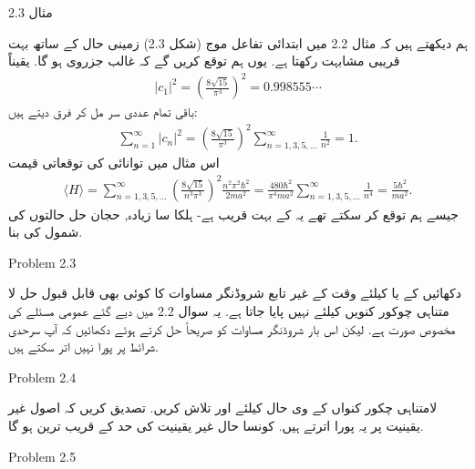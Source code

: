 مثال 2.3
 
ہم دیکھتے ہیں کہ مثال 2.2 میں ابتدائی تفاعل موج (شکل 2.3) زمینی حال  کے ساتھ بہت قریبی مشابہت رکھتا ہے. یوں ہم توقع کریں گے کہ 
 غالب جزروی ہو گا. یقیناً 
\begin{align*}
\left| c_{1} \right|^{2} = \left( \frac{8\sqrt{15}}{\pi^{3}} \right)^{2} = 0.998555 \cdots
\end{align*}
باقی تمام عددی سر مل کر فرق دیتے ہیں:
\begin{align*}
\sum_{n=1}^{\infty} \left| c_{n} \right|^{2} = \left( \frac{8\sqrt{15}}{\pi^{3}} \right)^{2} \sum_{n=1,3,5,...}^{\infty} \frac{1}{n^{2}} = 1.
\end{align*}
اس مثال میں توانائی کی توقعاتی قیمت
\begin{align*}
\langle H \rangle = \sum_{n=1,3,5,...}^{\infty} \left( \frac{8\sqrt{15}}{n^{3} \pi^{3}} \right)^{2} \frac{n^{2} \pi^{2} \hbar^{2}}{2ma^{2}} = \frac{480\hbar^{2}}{\pi^{4} ma^{2}} \sum_{n=1,3,5,...}^{\infty} \frac{1}{n^{4}} = \frac{5 \hbar^{2}}{ma^{2}}.
\end{align*}
جیسے ہم توقع کر سکتے تھے یہ  کے بہت قریب ہے- ہلکا سا زیادہ, حجان حل حالتوں کی شمول کی بنا. 


Problem 2.3 


دکھائیں کے  یا  کیلئے وقت کے غیر تابع شروڈنگر مساوات کا کوئی بھی قابل قبول حل لا متناہی چوکور کنویں کیلئے نہیں پایا جاتا ہے. یہ سوال 2.2 میں دیے گئے عمومی مسئلے کی مخصوص صورت ہے. لیکن اس بار شروڈنگر مساوات کو صریحاً حل کرتے ہوئے دکھائیں کہ آپ سرحدی شرائط پر پورا نہیں اتر سکتے ہیں.
 
Problem 2.4 

لامتناہی چکور کنواں کے  وی حال کیلئے  اور  تلاش کریں. تصدیق کریں کہ اصول غیر یقینیت پر یہ پورا اترتے ہیں. کونسا حال غیر یقینیت کی حد کے قریب ترین ہو گا.

Problem 2.5 

